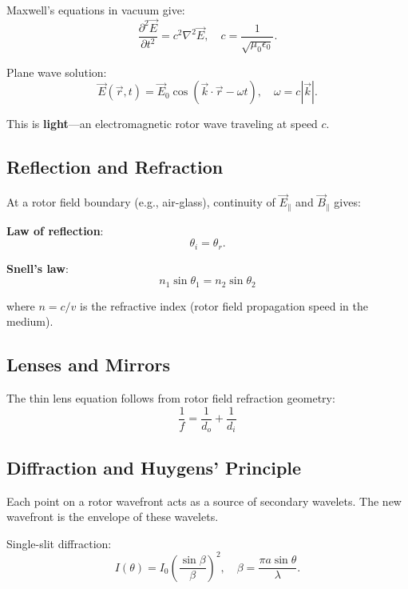 \documentclass[12pt,a4paper]{article}
\theoremstyle{definition}
\theoremstyle{remark}
\begin{document}
Maxwell's equations in vacuum give:
\begin{equation}
\frac{\partial^2 \vec{E}}{\partial t^2} = c^2 \nabla^2 \vec{E}, \quad c = \frac{1}{\sqrt{\mu_0 \epsilon_0}}.
\end{equation}

Plane wave solution:
\begin{equation}
\vec{E}(\vec{r},t) = \vec{E}_0 \cos(\vec{k} \cdot \vec{r} - \omega t), \quad \omega = c|\vec{k}|.
\end{equation}

This is \textbf{light}—an electromagnetic rotor wave traveling at speed $c$.

\subsection{Reflection and Refraction}

At a rotor field boundary (e.g., air-glass), continuity of $\vec{E}_\parallel$ and $\vec{B}_\parallel$ gives:

\textbf{Law of reflection}:
\begin{equation}
\theta_i = \theta_r.
\end{equation}

\textbf{Snell's law}:
\begin{equation}
\boxed{n_1 \sin\theta_1 = n_2 \sin\theta_2}
\end{equation}

where $n = c/v$ is the refractive index (rotor field propagation speed in the medium).

\subsection{Lenses and Mirrors}

The thin lens equation follows from rotor field refraction geometry:
\begin{equation}
\boxed{\frac{1}{f} = \frac{1}{d_o} + \frac{1}{d_i}}
\end{equation}

\subsection{Diffraction and Huygens' Principle}

Each point on a rotor wavefront acts as a source of secondary wavelets. The new wavefront is the envelope of these wavelets.

Single-slit diffraction:
\begin{equation}
I(\theta) = I_0 \left(\frac{\sin\beta}{\beta}\right)^2, \quad \beta = \frac{\pi a \sin\theta}{\lambda}.
\end{equation}
\end{document}
